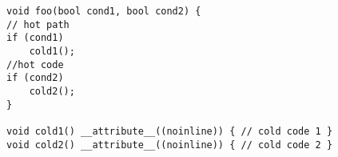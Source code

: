 \begin{lstlisting}
void foo(bool cond1, bool cond2) {
// hot path
if (cond1)
    cold1(); 
//hot code
if (cond2)
    cold2(); 
}

void cold1() __attribute__((noinline)) { // cold code 1 }
void cold2() __attribute__((noinline)) { // cold code 2 }
\end{lstlisting}
